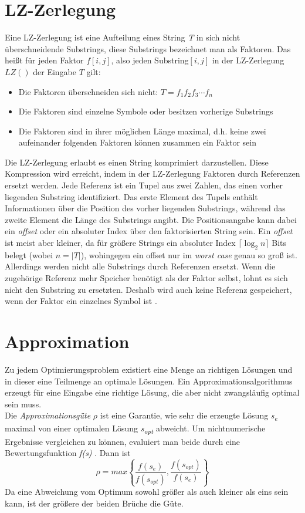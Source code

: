 \section{LZ-Zerlegung}
Eine LZ-Zerlegung ist eine Aufteilung eines String \textit{T} in sich nicht überschneidende Substrings, diese Substrings  bezeichnet man als Faktoren.
Das heißt für jeden Faktor $f[i,j]$, also jeden Substring$[i,j]$ in der LZ-Zerlegung $LZ()$ der Eingabe $T$ gilt:
\begin{itemize}
	\item Die Faktoren überschneiden sich nicht: $T = f_1  f_2 f_3 \cdots f_n$
	\item Die Faktoren sind einzelne Symbole oder besitzen vorherige Substrings
	\item Die Faktoren sind in ihrer möglichen Länge maximal, d.h. keine zwei aufeinander folgenden Faktoren können zusammen ein Faktor sein
	
\end{itemize}
Die LZ-Zerlegung erlaubt es einen String  komprimiert darzustellen.
Diese Kompression wird erreicht, indem in der LZ-Zerlegung Faktoren durch Referenzen ersetzt werden.
Jede Referenz ist ein Tupel aus zwei Zahlen, das  einen vorher liegenden Substring  identifiziert.
Das erste Element des Tupels enthält Informationen über die Position des vorher liegenden Substrings, während das zweite Element die Länge des Substrings angibt.
Die Positionsangabe kann dabei ein \textit{offset} oder ein absoluter Index über den faktorisierten  String  sein.
Ein \textit{offset} ist meist aber kleiner, da für größere Strings  ein absoluter Index $\lceil \log_2{n}\rceil$ Bits belegt (wobei $n = |T|$), wohingegen ein offset nur im \textit{worst case} genau so groß ist.\\
Allerdings werden nicht alle Substrings  durch Referenzen ersetzt.
Wenn die zugehörige Referenz mehr Speicher benötigt als der Faktor selbst, lohnt es sich nicht den Substring  zu ersetzten.
Deshalb wird auch keine Referenz gespeichert, wenn der Faktor ein einzelnes Symbol ist \cite{LZ77}.


\section{Approximation}

Zu jedem Optimierungsproblem existiert eine Menge an richtigen Lösungen und in dieser eine Teilmenge an optimale Lösungen. 
Ein Approximationsalgorithmus erzeugt für eine Eingabe eine richtige Lösung, die aber nicht zwangsläufig optimal sein muss.\\
Die \emph{Approximationsgüte} $\rho$ ist eine Garantie, wie sehr die erzeugte Lösung \textit{s\textsubscript{e}} maximal von einer optimalen Lösung \textit{s\textsubscript{opt}} abweicht. Um nichtnumerische Ergebnisse vergleichen zu können, evaluiert man beide durch eine Bewertungsfunktion \textit{f(s)} \cite{approxdef}. Dann ist 
\begin{equation}\nonumber
\rho= max
\left\{
\frac{f(s_{e})}{f(s_{opt})},\frac{f(s_{opt})}{f(s_{e})}
\right\}
\end{equation}
Da eine Abweichung vom Optimum sowohl größer als auch kleiner als eins sein kann, ist der größere der beiden Brüche die Güte.


